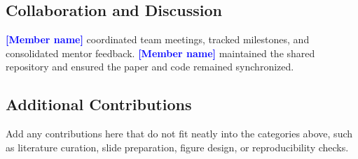 \documentclass[11pt]{article}
\newcommand{\fillme}[1]{\textcolor{blue}{[#1]}}
\begin{document}
\subsection{Collaboration and Discussion}
\textbf{\fillme{Member name}} coordinated team meetings, tracked milestones, and consolidated mentor feedback. \textbf{\fillme{Member name}} maintained the shared repository and ensured the paper and code remained synchronized.

\subsection{Additional Contributions}
Add any contributions here that do not fit neatly into the categories above, such as literature curation, slide preparation, figure design, or reproducibility checks.
\end{document}
